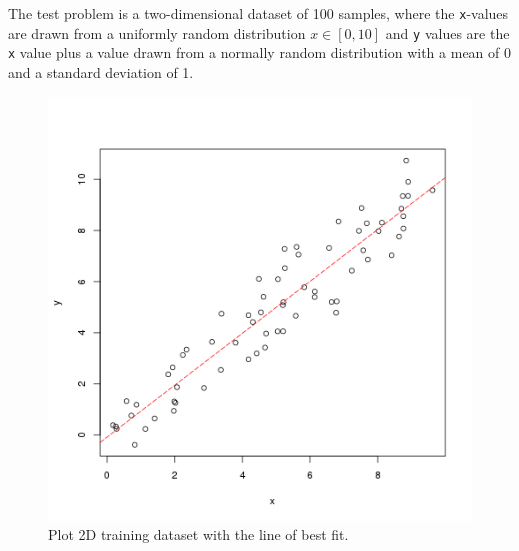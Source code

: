 The test problem is a two-dimensional dataset of 100 samples, where the \texttt{x}-values are drawn from a uniformly random distribution $x \in [0,10]$ and \texttt{y} values are the \texttt{x} value plus a value drawn from a normally random distribution with a mean of 0 and a standard deviation of 1.




\begin{figure}[htp]
\centering
\includegraphics[scale=0.45]{a_regression/ordinary_least_squares_regression_result.png}
\caption{Plot 2D training dataset with the line of best fit.}
\label{plot:ordinary_least_squares_regression_result}
\end{figure}



